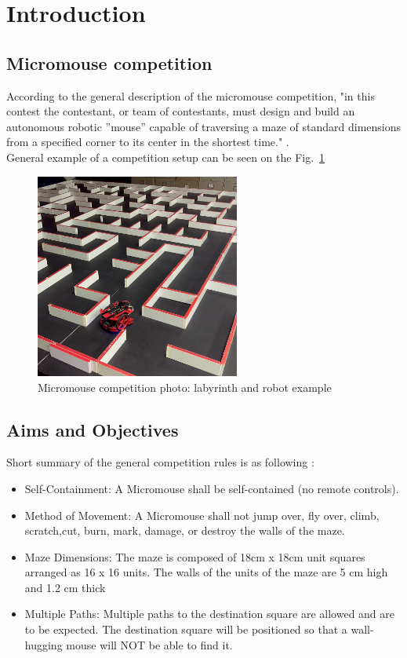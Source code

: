 
\section{Introduction}

\subsection{Micromouse competition}

According to the general description of the micromouse competition, "in this contest the contestant, or team of contestants, must design and build an autonomous robotic ”mouse” capable of traversing a maze of standard dimensions from a specified corner to its center in the shortest time." \cite{MicromouseRules}.\\
General example of a competition setup can be seen on the Fig.~\ref{fig:micromouse} 
\begin{figure}[htb]
    \centering
    \includegraphics[width=0.6\textwidth]{figures/micromouse-maze.jpg}
    \caption{Micromouse competition photo: labyrinth and robot example \cite{MicromousePhotoLink}}
    \label{fig:micromouse}
\end{figure}

\subsection{Aims and Objectives}

    Short summary of the general competition rules is as following \cite{MicromouseRules}:

\begin{itemize}
    \item Self-Containment: A Micromouse shall be self-contained (no remote controls).
    \item Method of Movement: A Micromouse shall not jump over, fly over, climb, scratch,cut, burn, mark, damage, or destroy the walls of the maze.
    \item Maze Dimensions: The maze is composed of 18cm x 18cm unit squares arranged as 16 x 16 units. The walls of the units of the maze are 5 cm high and 1.2 cm thick 
    \item Multiple Paths: Multiple paths to the destination square are allowed and are to be expected. The destination square will be positioned so that a wall-hugging mouse will NOT be able to find it.
\end{itemize}
    
